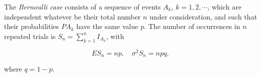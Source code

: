 The \textit{Bernoulli case} consists of a sequence of events $A_k$, $k = 1, 2, \cdots$, which are independent whatever be their total number $n$ under consideration, and such that their probabilities $PA_k$ have the same value $p$. The number of occurrences in $n$ repeated trials is $S_n = \sum_{k=1}^{n} I_{A_k}$, with

$$ES_n = np, \quad \sigma^2 S_n = npq,$$

where $q = 1-p$.
